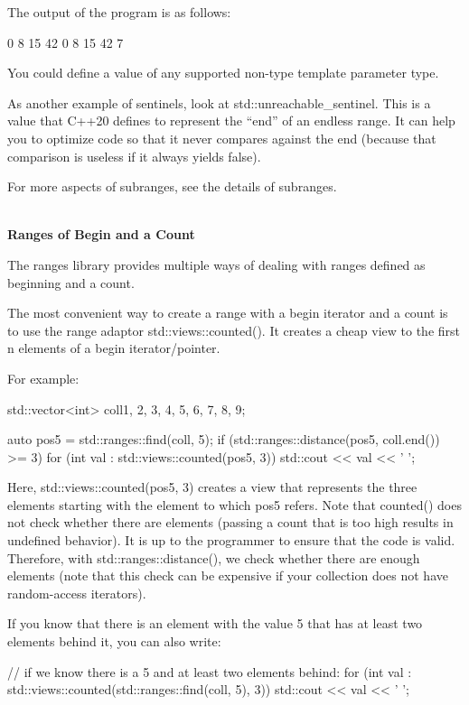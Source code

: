 The output of the program is as follows:

\begin{shell}
0 8 15 42
0 8 15 42 7
\end{shell}

You could define a value of any supported non-type template parameter type.

As another example of sentinels, look at std::unreachable\_sentinel. This is a value that C++20 defines to represent the “end” of an endless range. It can help you to optimize code so that it never compares against the end (because that comparison is useless if it always yields false).

For more aspects of subranges, see the details of subranges.

\noindent
\hspace*{\fill} \\ %
\textbf{Ranges of Begin and a Count}

The ranges library provides multiple ways of dealing with ranges defined as beginning and a count.

The most convenient way to create a range with a begin iterator and a count is to use the range adaptor std::views::counted(). It creates a cheap view to the first n elements of a begin iterator/pointer.

For example:

\begin{cpp}
std::vector<int> coll{1, 2, 3, 4, 5, 6, 7, 8, 9};

auto pos5 = std::ranges::find(coll, 5);
if (std::ranges::distance(pos5, coll.end()) >= 3) {
	for (int val : std::views::counted(pos5, 3)) {
		std::cout << val << ' ';
	}
}
\end{cpp}

Here, std::views::counted(pos5, 3) creates a view that represents the three elements starting with the element to which pos5 refers. Note that counted() does not check whether there are elements (passing a count that is too high results in undefined behavior). It is up to the programmer to ensure that the code is valid. Therefore, with std::ranges::distance(), we check whether there are enough elements (note that this check can be expensive if your collection does not have random-access iterators).

If you know that there is an element with the value 5 that has at least two elements behind it, you can also write:

\begin{cpp}
// if we know there is a 5 and at least two elements behind:
for (int val : std::views::counted(std::ranges::find(coll, 5), 3)) {
	std::cout << val << ' ';
}
\end{cpp}

